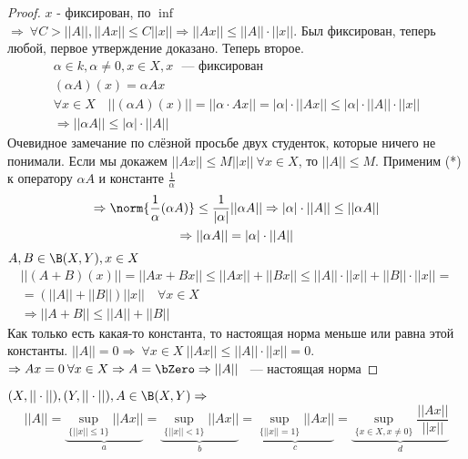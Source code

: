 \documentclass[document]{subfiles}
\begin{document}
\begin{proof}
    $x$ - фиксирован,  по $\inf$ $\Rightarrow \: \forall C > ||A||, ||Ax|| \leq C ||x|| \Rightarrow ||Ax|| \leq ||A|| \cdot ||x||$. Был фиксирован, теперь любой,
     первое утверждение доказано. Теперь второе. 
     \begin{gather*}
        \alpha \in k, \alpha \ne 0, x \in X, x \text{ ~--- фиксирован } \\
        (\alpha A) (x) = \alpha A x \\
        \forall x \in X \quad ||(\alpha A)(x) || = ||\alpha \cdot Ax|| = |\alpha| \cdot ||A x|| \leq |\alpha| \cdot ||A|| \cdot ||x|| \\
        \Rightarrow ||\alpha A|| \leq |\alpha|\cdot ||A|| \tag{*}
     \end{gather*}
     Очевидное замечание по слёзной просьбе двух студенток, которые ничего не понимали.
     Если мы докажем $||Ax|| \leq M||x|| \: \forall x \in X$, то $||A|| \leq M$. Применим (*) к оператору $\alpha A$ и константе $\frac{1}{\alpha}$
     \begin{gather*}
        \Rightarrow \norm{\frac{1}{\alpha}(\alpha A)} \leq \frac{1}{|\alpha|} ||\alpha A|| \Rightarrow |\alpha| \cdot || A|| \leq ||\alpha A|| \\
        \Rightarrow ||\alpha A || = |\alpha|\cdot ||A|| \\
     \end{gather*}
     $ A,B \in \B(X,Y), x \in X  $
     \begin{multline*}
        ||(A+B)(x)|| = ||Ax + Bx|| \leq ||Ax|| + ||Bx|| \leq ||A|| \cdot ||x|| + ||B|| \cdot ||x|| = \\
        = (||A|| + ||B||) ||x|| \quad \forall x \in X \\
        \Rightarrow ||A+B|| \leq ||A||+ ||B||
     \end{multline*}
     Как только есть какая-то константа, то настоящая норма меньше или равна этой константы. $||A|| = 0 \Rightarrow \: \forall x \in X \: ||Ax|| \leq ||A|| \cdot ||x|| = 0$.
     $\Rightarrow Ax = 0 \: \forall x \in X \Rightarrow A = \bZero \Rightarrow ||A||$ ~--- настоящая норма
\end{proof}
 
\begin{theorem}
    $(X, ||\cdot||), (Y, ||\cdot||), A \in \B(X,Y) \Rightarrow$ 
    \[ ||A|| = \underbrace{\sup_{\{||x|| \leq 1\}} ||Ax||}_a = \underbrace{\sup_{\{||x|| < 1\}} ||Ax||}_b = \underbrace{\sup_{\{||x|| = 1\}} ||Ax||}_c = \underbrace{\sup_{\{x \in X, x \ne 0\}} \frac{||Ax||}{||x||}}_d \]
\end{theorem}
 
\end{document}
